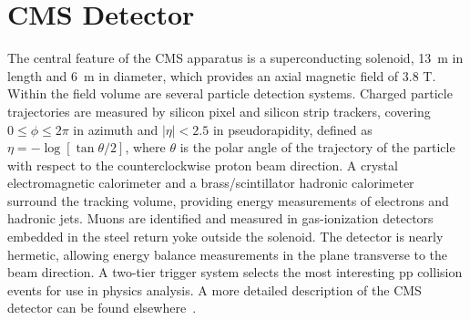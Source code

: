 \section{CMS Detector}

The central feature of the CMS apparatus is a superconducting
solenoid, 13~m in length and 6~m in diameter, which provides
an axial magnetic field of 3.8 T. Within the field volume are
several particle detection systems. 
Charged particle
trajectories are measured by silicon pixel and silicon strip trackers,
covering $0 \leq \phi \leq 2\pi$ in azimuth and $|\eta| < 2.5$ in pseudorapidity,
defined as $\eta = -\log [\tan \theta/2]$, where $\theta$ is the
polar angle of the trajectory of the particle with respect to
the counterclockwise proton beam direction. A crystal electromagnetic calorimeter
and a brass/scintillator hadronic calorimeter surround the
tracking volume, providing energy  measurements of electrons and
hadronic jets. Muons are identified and measured in gas-ionization detectors embedded in
the steel return yoke outside the solenoid. The detector is nearly
hermetic, allowing energy balance measurements in the plane
transverse to the beam direction. A two-tier trigger system selects
the most interesting pp collision events for use in physics analysis.
A more detailed description of the CMS detector can be found
elsewhere~\cite{JINST}.



